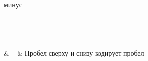 \begin{question}
\begin{longtable}[]
минус \\

\begin{minipage}[t]{\linewidth}\raggedright

\texttt{~}\strut \\

\hspace*{0.333em}\strut

\end{minipage} & ~ & Пробел сверху и снизу кодирует пробел \\

\bottomrule

\end{longtable}



~



~



~



~



~



~



~



~



~



~



~



~



~



~



~



~



~



~



~



~



~



~




\end{question}
